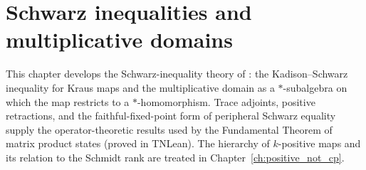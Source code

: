 \chapter{Schwarz inequalities and multiplicative domains}\label{ch:schwarz}

This chapter develops the Schwarz-inequality theory of
\cite[Chapter~5]{Wolf2012Quantum}: the Kadison--Schwarz inequality for Kraus
maps and the multiplicative domain as a $*$-subalgebra on which the map
restricts to a $*$-homomorphism. Trace adjoints, positive retractions, and the
faithful-fixed-point form of peripheral Schwarz equality supply the
operator-theoretic results used by the Fundamental Theorem of matrix product
states (proved in TNLean). The hierarchy of $k$-positive maps and its relation
to the Schmidt rank are treated in Chapter~\ref{ch:positive_not_cp}.









